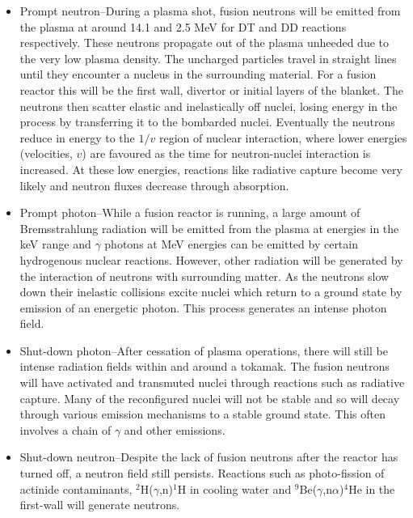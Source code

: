 \begin{itemize}
  \item Prompt neutron--During a plasma shot, fusion neutrons will be emitted from the plasma at around 14.1 and 2.5 MeV for DT and DD reactions respectively. These neutrons propagate out of the plasma unheeded due to the very low plasma density. The uncharged particles travel in straight lines until they encounter a nucleus in the surrounding material. For a fusion reactor this will be the first wall, divertor or initial layers of the blanket. The neutrons then scatter elastic and inelastically off nuclei, losing energy in the process by transferring it to the bombarded nuclei. Eventually the neutrons reduce in energy to the $1/v$ region of nuclear interaction, where lower energies (velocities, $v$) are favoured as the time for neutron-nuclei interaction is increased. At these low energies, reactions like radiative capture become very likely and neutron fluxes decrease through absorption.
  \item Prompt photon--While a fusion reactor is running, a large amount of Bremsstrahlung radiation will be emitted from the plasma at energies in the keV range and $\gamma$ photons at MeV energies can be emitted by certain hydrogenous nuclear reactions. However, other radiation will be generated by the interaction of neutrons with surrounding matter. As the neutrons slow down their inelastic collisions excite nuclei which return to a ground state by emission of an energetic photon. This process generates an intense photon field.
  \item Shut-down photon--After cessation of plasma operations, there will still be intense radiation fields within and around a tokamak. The fusion neutrons will have activated and transmuted nuclei through reactions such as radiative capture. Many of the reconfigured nuclei will not be stable and so will decay through various emission mechanisms to a stable ground state. This often involves a chain of $\gamma$ and other emissions.
  \item Shut-down neutron--Despite the lack of fusion neutrons after the reactor has turned off, a neutron field still persists. Reactions such as photo-fission of actinide contaminants, $^{2}$H($\gamma$,n)$^{1}$H in cooling water \cite{Kodeli1995} and $^{9}$Be($\gamma$,n$\alpha$)$^{4}$He in the first-wall \cite{Davis2010} will generate neutrons.
\end{itemize}

